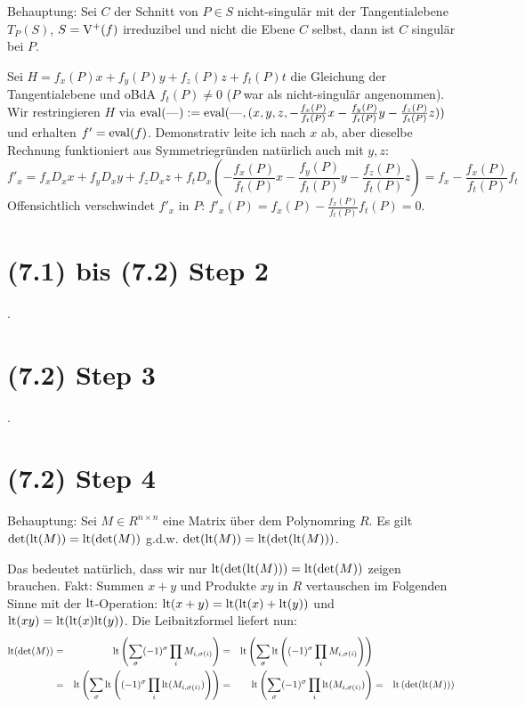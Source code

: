 {\LARGE %
Behauptung: Sei $C$ der Schnitt von $P \in S$ nicht-singulär mit der Tangentialebene $T_P(S)$, $S = \operatorname{V^+}(f)$ irreduzibel und nicht die Ebene $C$ selbst, dann ist $C$ singulär bei $P$.
} %

Sei $H = f_x(P)x + f_y(P)y + f_z(P)z + f_t(P)t$ die Gleichung der Tangentialebene und oBdA $f_t(P) \neq 0$ ($P$ war als nicht-singulär angenommen).
Wir restringieren $H$ via ${\operatorname{eval}}({\operatorname{---}}) := {\operatorname{eval}}({\operatorname{---}},(x,y,z,-\frac{f_x(P)}{f_t(P)}x-\frac{f_y(P)}{f_t(P)}y-\frac{f_z(P)}{f_t(P)}z))$ und erhalten
$f' = {\operatorname{eval}}(f)$. Demonstrativ leite ich nach $x$ ab, aber dieselbe Rechnung funktioniert aus Symmetriegründen natürlich auch mit $y,z$:
\begin{equation}
f'_x = f_x D_xx + f_y D_x y + f_z D_x z + f_t D_x (-\frac{f_x(P)}{f_t(P)}x-\frac{f_y(P)}{f_t(P)}y-\frac{f_z(P)}{f_t(P)}z) = f_x - \frac{f_x(P)}{f_t(P)} f_t
\end{equation}
Offensichtlich verschwindet $f'_x$ in $P$: $f'_x(P) = f_x(P) - \frac{f_x(P)}{f_t(P)} f_t(P) = 0$.
\section{(7.1) bis (7.2) Step 2} .
\section{(7.2) Step 3} .
\section{(7.2) Step 4}

{\LARGE %
Behauptung: Sei $M \in R^{n\times n}$ eine Matrix über dem Polynomring $R$.
Es gilt $\det({\operatorname{lt}}(M)) = {\operatorname{lt}}(\det(M))$ g.d.w. $\det({\operatorname{lt}}(M)) = {\operatorname{lt}}(\det({\operatorname{lt}}(M)))$.
} %

Das bedeutet natürlich, dass wir nur ${\operatorname{lt}}(\det({\operatorname{lt}}(M))) = {\operatorname{lt}}(\det(M))$ zeigen brauchen.
Fakt: Summen $x+y$ und Produkte $xy$ in $R$ vertauschen im Folgenden Sinne mit der ${\operatorname{lt}}$-Operation: ${\operatorname{lt}}(x+y) = {\operatorname{lt}}({\operatorname{lt}}(x) + {\operatorname{lt}}(y))$ und ${\operatorname{lt}}(xy) = {\operatorname{lt}}({\operatorname{lt}}(x){\operatorname{lt}}(y))$.
Die Leibnitzformel liefert nun:
\begin{align*}
  {\operatorname{lt}}(\det(M))
&= &{\operatorname{lt}}\left(\sum_\sigma (-1)^\sigma \prod_i M_{i,\sigma(i)}\right)
&= &{\operatorname{lt}}\left(\sum_\sigma {\operatorname{lt}}\left((-1)^\sigma \prod_i M_{i,\sigma(i)}\right)\right)
& &
\\
&= &{\operatorname{lt}}\left(\sum_\sigma {\operatorname{lt}}\left((-1)^\sigma \prod_i {\operatorname{lt}}(M_{i,\sigma(i)})\right)\right)
&= &{\operatorname{lt}}\left(\sum_\sigma (-1)^\sigma \prod_i {\operatorname{lt}}(M_{i,\sigma(i)})\right)
&= &{\operatorname{lt}}\left(\det({\operatorname{lt}}(M))\right)
\end{align*}
